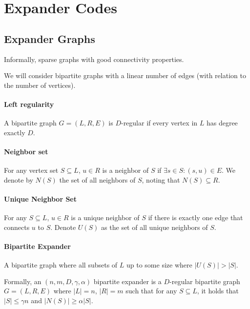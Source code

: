\documentclass{idc_msc}
\begin{document}
\section{Expander Codes}

\subsection{Expander Graphs}

Informally, sparse graphs with good connectivity properties.

We will consider bipartite graphs with a linear number of edges (with relation to the number of vertices).

\paragraph{Left regularity}

A bipartite graph \(G = (L, R, E)\) is \(D\)-regular if every vertex in \(L\) has degree exactly \(D\).

\paragraph{Neighbor set}

For any vertex set \(S \subseteq L\), \(u \in R\) is a neighbor of \(S\) if \(\exists s \in S : (s,u) \in E\).
We denote by \(N(S)\) the set of all neighbors of \(S\), noting that \(N(S) \subseteq R\).

\paragraph{Unique Neighbor Set}

For any \(S \subseteq L\), \(u \in R\) is a unique neighbor of \(S\) if there is exactly one edge that connects \(u\) to \(S\).
Denote \(U(S)\) as the set of all unique neighbors of \(S\).

\paragraph{Bipartite Expander}

A bipartite graph where all subsets of \(L\) up to some size where \(|U(S)| > |S|\).

Formally, an \((n, m, D, \gamma, \alpha)\) bipartite expander is a \(D\)-regular bipartite graph \(G = (L, R, E)\) where \(|L|=n\), \(|R| = m\) such that for any \(S \subseteq L\), it holds that \(|S| \le \gamma n\) and \(|N(S)| \ge \alpha |S|\).
\end{document}
